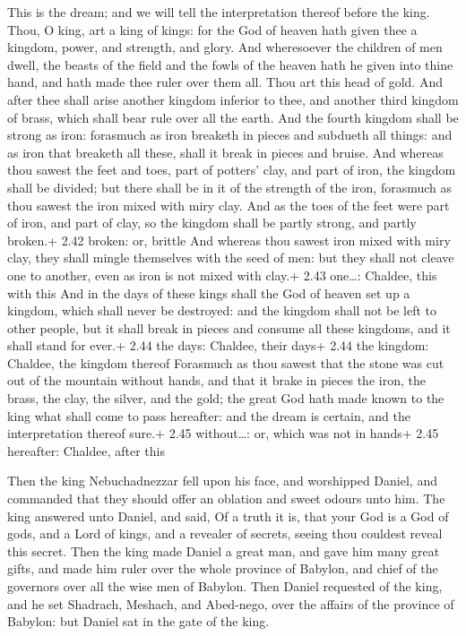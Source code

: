  This is the dream; and we will tell the interpretation
thereof before the king.  Thou, O king, art a king of
kings: for the God of heaven hath given thee a kingdom, power, and
strength, and glory.  And wheresoever the children of men
dwell, the beasts of the field and the fowls of the heaven hath he given
into thine hand, and hath made thee ruler over them all. Thou art this
head of gold.  And after thee shall arise another kingdom
inferior to thee, and another third kingdom of brass, which shall bear
rule over all the earth.  And the fourth kingdom shall be
strong as iron: forasmuch as iron breaketh in pieces and subdueth all
things: and as iron that breaketh all these, shall it break in pieces
and bruise.  And whereas thou sawest the feet and toes,
part of potters' clay, and part of iron, the kingdom shall be divided;
but there shall be in it of the strength of the iron, forasmuch as thou
sawest the iron mixed with miry clay.  And as the toes of
the feet were part of iron, and part of clay, so the kingdom shall be
partly strong, and partly broken.+ 2.42 broken: or, brittle
 And whereas thou sawest iron mixed with miry clay, they
shall mingle themselves with the seed of men: but they shall not cleave
one to another, even as iron is not mixed with clay.+ 2.43 one\ldots:
Chaldee, this with this  And in the days of these kings
shall the God of heaven set up a kingdom, which shall never be
destroyed: and the kingdom shall not be left to other people, but it
shall break in pieces and consume all these kingdoms, and it shall stand
for ever.+ 2.44 the days: Chaldee, their days+ 2.44 the kingdom:
Chaldee, the kingdom thereof  Forasmuch as thou sawest that
the stone was cut out of the mountain without hands, and that it brake
in pieces the iron, the brass, the clay, the silver, and the gold; the
great God hath made known to the king what shall come to pass hereafter:
and the dream is certain, and the interpretation thereof sure.+ 2.45
without\ldots: or, which was not in hands+ 2.45 hereafter: Chaldee,
after this

 Then the king Nebuchadnezzar fell upon his face, and
worshipped Daniel, and commanded that they should offer an oblation and
sweet odours unto him.  The king answered unto Daniel, and
said, Of a truth it is, that your God is a God of gods, and a Lord of
kings, and a revealer of secrets, seeing thou couldest reveal this
secret.  Then the king made Daniel a great man, and gave
him many great gifts, and made him ruler over the whole province of
Babylon, and chief of the governors over all the wise men of Babylon.
 Then Daniel requested of the king, and he set Shadrach,
Meshach, and Abed-nego, over the affairs of the province of Babylon: but
Daniel sat in the gate of the king.

